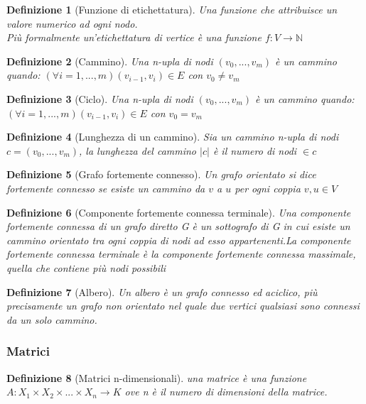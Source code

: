 \documentclass[a4paper]{article}
\newtheorem*{definition}{Definizione}
\begin{document}
\begin{definition}[Funzione di etichettatura]Una funzione che attribuisce un valore numerico ad ogni nodo.\\
Più formalmente un'etichettatura di vertice è una funzione $f: V \rightarrow \mathbb{N}$ 
\end{definition}

\begin{definition}[Cammino]Una n-upla di nodi $(v_0, ..., v_m)$ è un cammino quando: $(\forall i=1,...,m)(v_{i-1},v_{i})\in E$ con $v_0 \neq v_m$
\end{definition}

\begin{definition}[Ciclo]Una n-upla di nodi $(v_0, ..., v_m)$ è un cammino quando: $(\forall i=1,...,m)(v_{i-1},v_{i})\in E$ con $v_0 = v_m$
\end{definition}

\begin{definition}[Lunghezza di un cammino]Sia un cammino n-upla di nodi $c=(v_0, ..., v_m)$, la lunghezza del cammino $|c|$ è il numero di nodi $\in c$
\end{definition}

\begin{definition}[Grafo fortemente connesso]Un grafo orientato si dice fortemente connesso se esiste un cammino da $v$ a $u$ per ogni coppia $v,u \in V$
\end{definition}

\begin{definition}[Componente fortemente connessa terminale]Una componente fortemente connessa di un grafo diretto G è un sottografo di G in cui esiste un cammino orientato tra ogni coppia di nodi ad esso appartenenti.La componente fortemente connessa terminale è la componente fortemente connessa massimale, quella che contiene più nodi possibili
\end{definition}

\begin{definition}[Albero]Un albero è un grafo connesso ed aciclico, più precisamente un grafo non orientato nel quale due vertici qualsiasi sono connessi da un solo cammino.


\end{definition}

\subsubsection{Matrici}

\begin{definition}[Matrici n-dimensionali]una matrice è una funzione $ A\colon X_1 \times X_2 \times ... \times X_n \rightarrow K $ ove n è il numero di dimensioni della matrice.
\end{definition}
\end{document}
